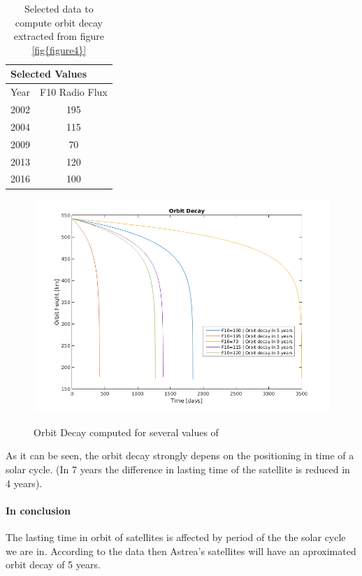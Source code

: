 \begin{table}[]
\centering
\caption{Selected data to compute orbit decay extracted from figure \ref{fig{figure4}}}
\label{OrbDecCompT}
\begin{tabular}{|l|c|}
\hline
\multicolumn{2}{|l|}{Selected Values}      \\ \hline
Year & \multicolumn{1}{l|}{F10 Radio Flux} \\ \hline
2002 & 195                                 \\ \hline
2004 & 115                                 \\ \hline
2009 & 70                                  \\ \hline
2013 & 120                                 \\ \hline
2016 & 100                                 \\ \hline
\end{tabular}
\end{table}  
\begin{figure}[H] %
	\centering
	\includegraphics[width=.8\textwidth]{OrbitDecayComp.png}\\
	\caption{Orbit Decay computed for several values of }
	\label{fig:OrbitDecayComp} 
\end{figure}

As it can be seen, the orbit decay strongly depens on the positioning in time of a solar cycle. (In 7 years the difference in lasting time of the satellite is reduced in 4 years).

\paragraph{In conclusion}
The lasting time in orbit of satellites is affected by period of the the solar cycle we are in. According to the data then Astrea's satellites will have an aproximated orbit decay of 5 years.


 